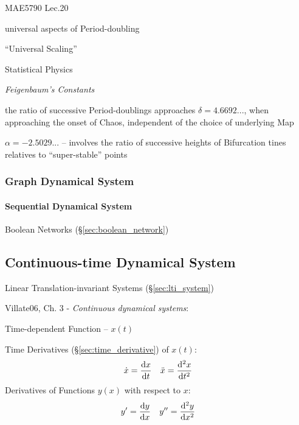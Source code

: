 MAE5790 Lec.20

universal aspects of Period-doubling

``Universal Scaling''

Statistical Physics

\emph{Feigenbaum's Constants}

the ratio of successive Period-doublings approaches $\delta = 4.6692...$, when
approaching the onset of Chaos, independent of the choice of underlying Map

$\alpha = -2.5029...$ -- involves the ratio of successive heights of Bifurcation
tines relatives to ``super-stable'' points



\subsubsection{Graph Dynamical System}\label{sec:graph_dynamical_system}

\paragraph{Sequential Dynamical System}
\label{sec:sequential_dynamical_system}\hfill

\fist Boolean Networks (\S\ref{sec:boolean_network})



\subsection{Continuous-time Dynamical System}
\label{sec:continuous_dynamical_system}

\fist Linear Translation-invariant Systems (\S\ref{sec:lti_system})

Villate06, Ch. 3 - \emph{Continuous dynamical systems}:

Time-dependent Function -- $x(t)$

Time Derivatives (\S\ref{sec:time_derivative}) of $x(t)$:
\begin{align*}
  \dot{x} &= \frac{\mathrm{d}x}{\mathrm{d}t} & \ddot{x} &= \frac{\mathrm{d}^2x}{\mathrm{d}t^2} \\
\end{align*}
Derivatives of Functions $y(x)$ with respect to $x$:
\begin{align*}
  y' &= \frac{\mathrm{d}y}{\mathrm{d}x} & y'' &= \frac{\mathrm{d}^2y}{\mathrm{d}x^2} \\
\end{align*}



